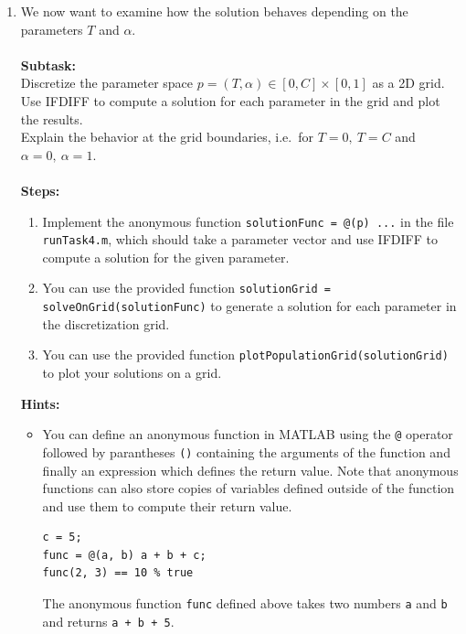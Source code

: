\begin{enumerate}[label=\alph*)]
    \item \label{item:task4c} We now want to examine how the solution behaves depending on the parameters $T$ and $\alpha$. \\ \\
    \textbf{Subtask:} \\
    Discretize the parameter space $p = (T, \alpha) \in [0, C] \times [0, 1]$ as a 2D grid. \\
    Use IFDIFF to compute a solution for each parameter in the grid and plot the results. \\
    Explain the behavior at the grid boundaries, i.e.~for $T = 0,\: T = C$ and $\alpha = 0, \:\alpha = 1$. \\ \\
    \textbf{Steps:}
    \begin{enumerate}[label=\arabic*.]
       \item Implement the anonymous function \lstinline|solutionFunc = @(p) ...| in the file \texttt{runTask4.m}, which should take a parameter vector and use IFDIFF to compute a solution for the given parameter.
       \item You can use the provided function \lstinline|solutionGrid = solveOnGrid(solutionFunc)| to generate a solution for each parameter in the discretization grid.
       \item You can use the provided function \lstinline|plotPopulationGrid(solutionGrid)| to plot your solutions on a grid.
    \end{enumerate}
    \textbf{Hints:}
    \begin{itemize}
       \item You can define an anonymous function in MATLAB using the \lstinline|@| operator followed by parantheses \lstinline|()| containing the arguments of the function and finally an expression which defines the return value. Note that anonymous functions can also store copies of variables defined outside of the function and use them to compute their return value.
       \begin{lstlisting}
c = 5;
func = @(a, b) a + b + c;
func(2, 3) == 10 % true
        \end{lstlisting}
        The anonymous function \lstinline|func| defined above takes two numbers \lstinline|a| and \lstinline|b| and returns \lstinline|a + b + 5|.
    \end{itemize}


\end{enumerate}
